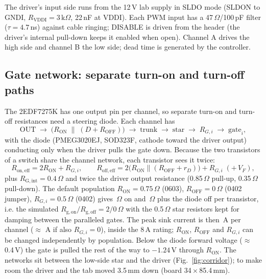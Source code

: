 \documentclass[10pt,a4paper]{article}
\begin{document}
The driver's input side runs from the 12\,V lab supply in SLDO mode (SLDON to GNDI, $R_\mathrm{VDDI}=3\,\mathrm{k}\Omega$, 22\,nF at VDDI). Each PWM input has a 47\,$\Omega$/100\,pF filter ($\tau=4.7$\,ns) against cable ringing; DISABLE is driven from the header (the driver's internal pull-down keeps it enabled when open). Channel A drives the high side and channel B the low side; dead time is generated by the controller.

\subsection{Gate network: separate turn-on and turn-off paths}
The 2EDF7275K has one output pin per channel, so separate turn-on and turn-off resistances need a steering diode. Each channel has
\[
\text{OUT}\;\rightarrow\;\bigl(R_\mathrm{ON}\;\parallel\;(D + R_\mathrm{OFF})\bigr)\;\rightarrow\;\text{trunk}\;\rightarrow\;\text{star}\;\rightarrow\;R_{G,i}\;\rightarrow\;\text{gate}_i,
\]
with the diode (PMEG3020EJ, SOD323F, cathode toward the driver output) conducting only when the driver pulls the gate down. Because the two transistors of a switch share the channel network, each transistor sees it twice:
\[
R_\mathrm{on,eff}=2R_\mathrm{ON}+R_{G,i},\qquad R_\mathrm{off,eff}=2\bigl(R_\mathrm{ON}\parallel(R_\mathrm{OFF}+r_D)\bigr)+R_{G,i}\;(+\,V_F),
\]
plus $R_\mathrm{G,int}=0.4\,\Omega$ and twice the driver output resistance (0.85\,$\Omega$ pull-up, 0.35\,$\Omega$ pull-down). The default population $R_\mathrm{ON}=0.75\,\Omega$ (0603), $R_\mathrm{OFF}=0\,\Omega$ (0402 jumper), $R_{G,i}=0.5\,\Omega$ (0402) gives \RgFet\,$\Omega$ on and \RoffFet\,$\Omega$ plus the diode off per transistor, i.e. the simulated $R_\mathrm{g,on}/R_\mathrm{g,off}=2/0\,\Omega$ with the 0.5\,$\Omega$ star resistors kept for damping between the paralleled gates. The peak sink current is then \Ioff\,A per channel ($\approx$\,\IoffNoDiodeR\,A if also $R_{G,i}=0$), inside the 8\,A rating; $R_\mathrm{ON}$, $R_\mathrm{OFF}$ and $R_{G,i}$ can be changed independently by population. Below the diode forward voltage ($\approx$\,0.4\,V) the gate is pulled the rest of the way to $-1.24$\,V through $R_\mathrm{ON}$. The networks sit between the low-side star and the driver (Fig.~\ref{fig:corridor}); to make room the driver and the tab moved 3.5\,mm down (board 34\,$\times$\,85.4\,mm).
\end{document}
